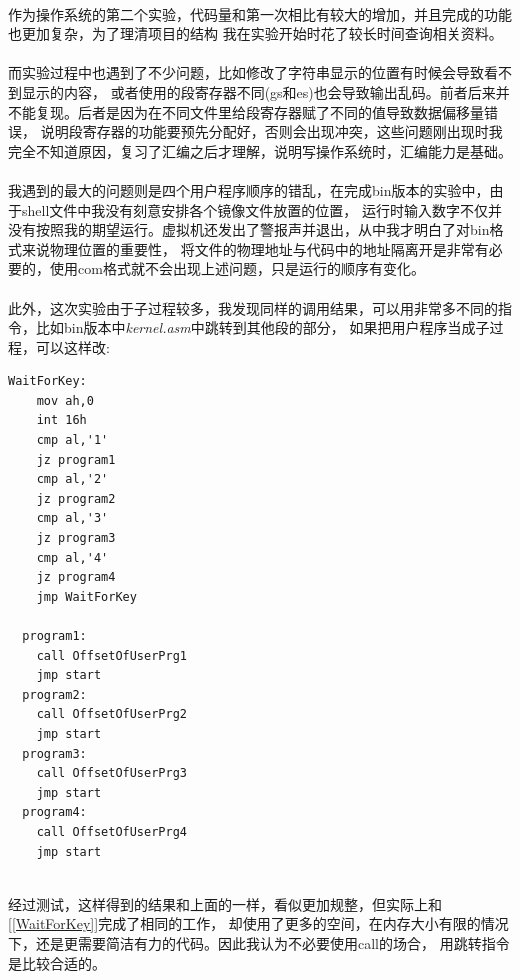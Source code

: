\documentclass[a4paper, 11pt]{article} %
\begin{document}
\paragraph{}
作为操作系统的第二个实验，代码量和第一次相比有较大的增加，并且完成的功能也更加复杂，为了理清项目的结构
我在实验开始时花了较长时间查询相关资料。
\paragraph{}
而实验过程中也遇到了不少问题，比如修改了字符串显示的位置有时候会导致看不到显示的内容，
或者使用的段寄存器不同(gs和es)也会导致输出乱码。前者后来并不能复现。后者是因为在不同文件里给段寄存器赋了不同的值导致数据偏移量错误，
说明段寄存器的功能要预先分配好，否则会出现冲突，这些问题刚出现时我完全不知道原因，复习了汇编之后才理解，说明写操作系统时，汇编能力是基础。
\paragraph{}
我遇到的最大的问题则是四个用户程序顺序的错乱，在完成bin版本的实验中，由于shell文件中我没有刻意安排各个镜像文件放置的位置，
运行时输入数字不仅并没有按照我的期望运行。虚拟机还发出了警报声并退出，从中我才明白了对bin格式来说物理位置的重要性，
将文件的物理地址与代码中的地址隔离开是非常有必要的，使用com格式就不会出现上述问题，只是运行的顺序有变化。
\paragraph{}
此外，这次实验由于子过程较多，我发现同样的调用结果，可以用非常多不同的指令，比如bin版本中\textit{kernel.asm}中跳转到其他段的部分，
如果把用户程序当成子过程，可以这样改:
\begin{lstlisting}[language={[x86masm]Assembler},caption=获得键盘输入并跳转]
  WaitForKey:
	mov ah,0
	int 16h
	cmp al,'1'
	jz program1
	cmp al,'2'
	jz program2
	cmp al,'3'
	jz program3
	cmp al,'4'
	jz program4
	jmp WaitForKey
  
  program1:
	call OffsetOfUserPrg1
	jmp start
  program2:
	call OffsetOfUserPrg2
	jmp start
  program3:
	call OffsetOfUserPrg3
	jmp start
  program4:
	call OffsetOfUserPrg4
	jmp start
  
\end{lstlisting}
经过测试，这样得到的结果和上面的一样，看似更加规整，但实际上和[\ref{WaitForKey}]完成了相同的工作，
却使用了更多的空间，在内存大小有限的情况下，还是更需要简洁有力的代码。因此我认为不必要使用call的场合，
用跳转指令是比较合适的。
\end{document}
